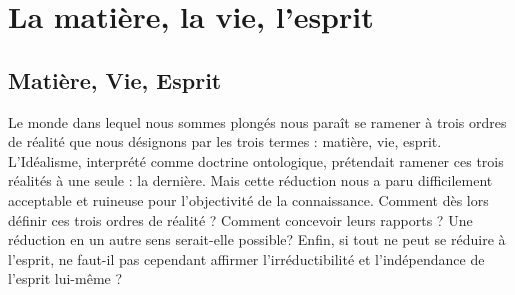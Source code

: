 
\chapter{La matière, la vie, l'esprit}


\section{Matière, Vie, Esprit}%
Le monde dans lequel nous
sommes plongés nous paraît se ramener à trois ordres de réalité que
nous désignons par les trois termes : matière, vie, esprit. L’Idéalisme,
interprété comme doctrine ontologique, prétendait ramener ces trois
réalités à une seule : la dernière. Mais cette réduction nous a paru
difficilement acceptable et ruineuse pour l’objectivité de la connaissance.
Comment dès lors définir ces trois ordres de réalité ? Comment
concevoir leurs rapports ? Une réduction en un autre sens serait-elle
possible? Enfin, si tout ne peut se réduire à l’esprit, ne faut-il pas
cependant affirmer l’irréductibilité et l'indépendance de l'esprit
lui-même ?

